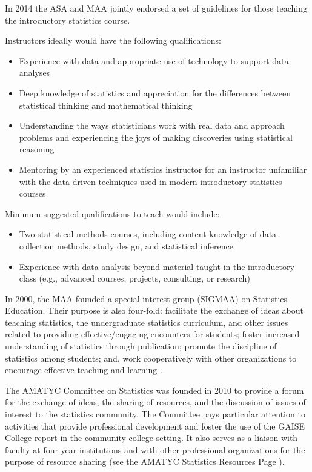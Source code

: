 In 2014 the ASA and MAA jointly endorsed a set of guidelines  for those teaching the introductory statistics course.

Instructors ideally would have the following qualifications:
\begin{itemize}
\item Experience with data and appropriate use of technology to support data analyses
\item Deep knowledge of statistics and appreciation for the differences between statistical thinking and mathematical thinking
\item Understanding the ways statisticians work with real data and approach problems and experiencing the joys of making discoveries using statistical reasoning
\item Mentoring by an experienced statistics instructor for an instructor unfamiliar with the data-driven techniques used in modern introductory statistics courses
\end{itemize}

Minimum suggested qualifications to teach would include:
\begin{itemize}
\item Two statistical methods courses, including content knowledge of data-collection methods, study design, and statistical inference
\item Experience with data analysis beyond material taught in the introductory class (e.g., advanced courses, projects, consulting, or research)
\end{itemize}

In 2000, the MAA founded a special interest group (SIGMAA) on Statistics Education.  Their purpose is also four-fold:  facilitate the exchange of ideas about teaching statistics, the undergraduate statistics curriculum, and other issues related to providing effective/engaging encounters for students; foster increased understanding of statistics through publication; promote the discipline of statistics among students; and, work cooperatively with other organizations to encourage effective teaching and learning .

The AMATYC Committee on Statistics was founded in 2010 to provide a forum for the exchange of ideas, the sharing of resources, and the discussion of issues of interest to the statistics community. The Committee pays particular attention to activities that provide professional development and foster the use of the GAISE College report in the community college setting. It also serves as a liaison with faculty at four-year institutions and with other professional organizations for the purpose of resource sharing (see the AMATYC Statistics Resources Page ).

